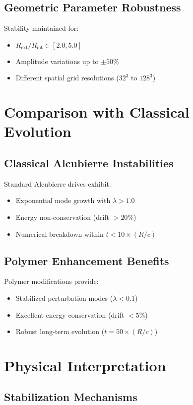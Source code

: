 \documentclass[11pt,a4paper]{article}
\begin{document}
\subsection{Geometric Parameter Robustness}

Stability maintained for:
\begin{itemize}
\item $R_{\text{ext}}/R_{\text{int}} \in [2.0, 5.0]$
\item Amplitude variations up to $\pm 50\%$
\item Different spatial grid resolutions ($32^3$ to $128^3$)
\end{itemize}

\section{Comparison with Classical Evolution}

\subsection{Classical Alcubierre Instabilities}

Standard Alcubierre drives exhibit:
\begin{itemize}
\item Exponential mode growth with $\lambda > 1.0$
\item Energy non-conservation (drift $> 20\%$)
\item Numerical breakdown within $t < 10 \times (R/c)$
\end{itemize}

\subsection{Polymer Enhancement Benefits}

Polymer modifications provide:
\begin{itemize}
\item Stabilized perturbation modes ($\lambda < 0.1$)
\item Excellent energy conservation (drift $< 5\%$)
\item Robust long-term evolution ($t = 50 \times (R/c)$)
\end{itemize}

\section{Physical Interpretation}

\subsection{Stabilization Mechanisms}
\end{document}

